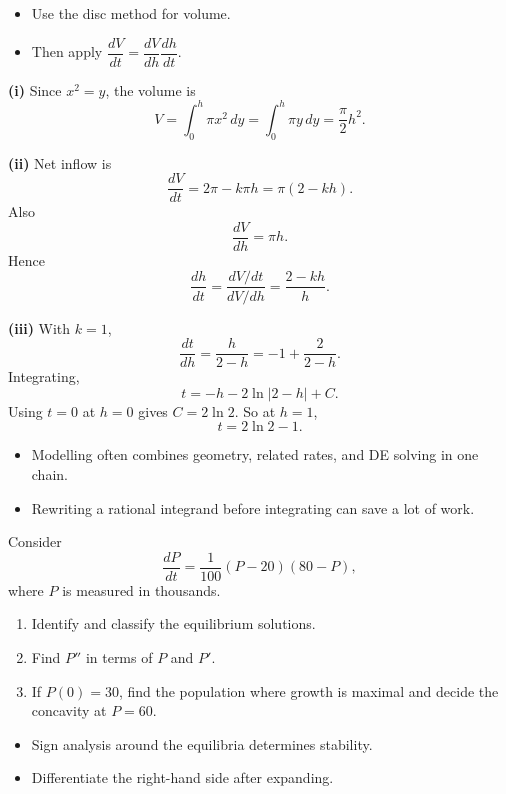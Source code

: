\begin{hint}
\begin{itemize}[leftmargin=*]
    \item Use the disc method for volume.
    \item Then apply $\dfrac{dV}{dt}=\dfrac{dV}{dh}\dfrac{dh}{dt}$.
\end{itemize}
\end{hint}

\begin{solution}
\textbf{(i)} Since $x^2=y$, the volume is
\[
V=\int_0^h \pi x^2\,dy=\int_0^h \pi y\,dy=\boxed{\frac{\pi}{2}h^2}.
\]

\textbf{(ii)} Net inflow is
\[
\frac{dV}{dt}=2\pi-k\pi h=\pi(2-kh).
\]
Also
\[
\frac{dV}{dh}=\pi h.
\]
Hence
\[
\boxed{\frac{dh}{dt}=\frac{dV/dt}{dV/dh}=\frac{2-kh}{h}}.
\]

\textbf{(iii)} With $k=1$,
\[
\frac{dt}{dh}=\frac{h}{2-h}=-1+\frac{2}{2-h}.
\]
Integrating,
\[
t=-h-2\ln|2-h|+C.
\]
Using $t=0$ at $h=0$ gives $C=2\ln2$. So at $h=1$,
\[
\boxed{t=2\ln2-1}.
\]
\end{solution}

\begin{takeaways}
\begin{itemize}[leftmargin=*]
    \item Modelling often combines geometry, related rates, and DE solving in one chain.
    \item Rewriting a rational integrand before integrating can save a lot of work.
\end{itemize}
\end{takeaways}

\begin{problem}
Consider
\[
\frac{dP}{dt}=\frac1{100}(P-20)(80-P),
\]
where $P$ is measured in thousands.
\begin{enumerate}
    \item[\textbf{i}] Identify and classify the equilibrium solutions.
    \item[\textbf{ii}] Find $P''$ in terms of $P$ and $P'$.
    \item[\textbf{iii}] If $P(0)=30$, find the population where growth is maximal and decide the concavity at $P=60$.
\end{enumerate}
\end{problem}

\begin{hint}
\begin{itemize}[leftmargin=*]
    \item Sign analysis around the equilibria determines stability.
    \item Differentiate the right-hand side after expanding.
\end{itemize}
\end{hint}

